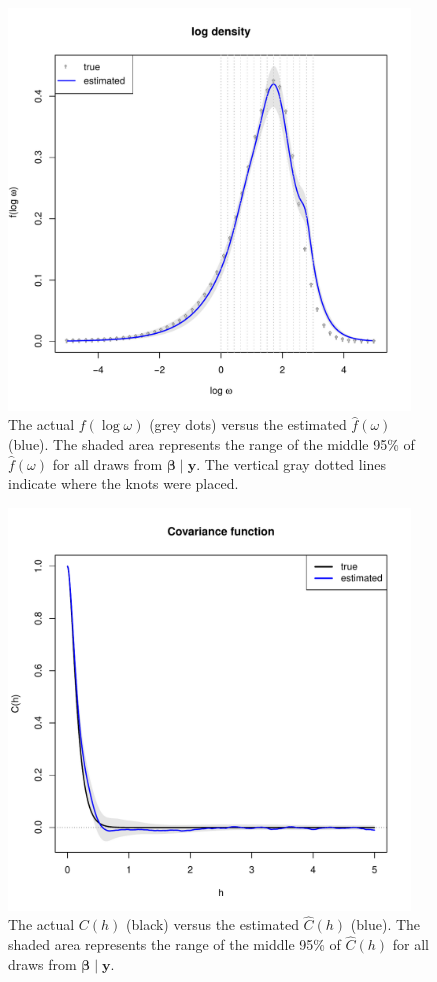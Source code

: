 \documentclass[12pt]{article}
\begin{document}
\begin{figure}[!htb]
  \centering
  \includegraphics[width=0.95\textwidth]{logdensity2.pdf}
  \caption{\small The actual $f(\log \omega)$ (grey dots) versus the estimated $\hat{f}(\omega)$ (blue). The shaded area represents the range of the middle 95\% of $\hat{f}(\omega)$ for all draws from $\bm{\beta} \;|\; \bm{y}$. The vertical gray dotted lines indicate where the knots were placed.}
  \label{fig:result}
\end{figure}

\begin{figure}[!htb]
  \centering
  \includegraphics[width=0.95\textwidth]{covar.pdf}
  \caption{\small The actual $C(h)$ (black) versus the estimated $\widehat{C}(h)$ (blue). The shaded area represents the range of the middle 95\% of $\widehat{C}(h)$ for all draws from $\bm{\beta} \;|\; \bm{y}$.}
  \label{fig:result-covar}
\end{figure}
\end{document}
